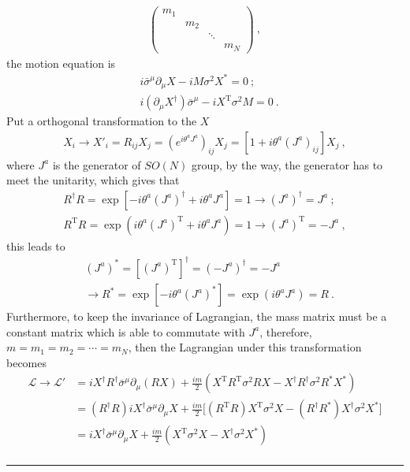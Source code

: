 \documentclass[12pt]{report}
\numberwithin{problemname}{chapter}
\newenvironment{solution}{\vspace{1em}\par\noindent{\large\textbf{\textsc{Solution}}}\par}{\vspace{1em}\hrule}
\begin{document}
\begin{solution}
\begin{enumerate}[(a)]
\begin{align}
\begin{pmatrix}
          m_1 & & & \\
          & m_2 & & \\
          & & \ddots & \\
          & & & m_N 
        \end{pmatrix}\ ,
    \end{align}
    the motion equation is
    \begin{align}
        &i\bar{\sigma}^{\mu}\partial_{\mu}X-iM\sigma^2 X^*=0\ ; \nonumber \\
        &i(\partial_{\mu}X^{\dagger})\bar{\sigma}^{\mu}-iX^{\text{T}}\sigma^2M=0\ .
    \end{align}
    Put a orthogonal transformation to the $X$
    \begin{align}
        X_i\to X'_i=R_{ij}X_j=(e^{i\theta^aJ^a})_{ij}X_j=[1+i\theta^a(J^a)_{ij}]X_j\ ,
    \end{align}
    where $J^a$ is the generator of $SO(N)$ group, by the way, the generator has to meet the unitarity, which gives that
    \begin{align}
        R^{\dagger}R= \exp[-i\theta^a(J^{a})^{\dagger}+i\theta^aJ^a]=1\to (J^{a})^{\dagger}=J^a\ ; \\
        R^{\text{T}}R=\exp(i\theta^a(J^{a})^{\text{T}}+i\theta^aJ^a)=1\to (J^a)^{\text{T}}=-J^a\ ,
    \end{align}
    this leads to
    \begin{align}
        &(J^a)^*=[(J^a)^\text{T}]^{\dagger}=(-J^a)^{\dagger}=-J^a \nonumber \\
        &\to R^*=\exp[-i\theta^a(J^a)^*]=\exp(i\theta^aJ^a)=R\ .
    \end{align}
    Furthermore, to keep the invariance of Lagrangian, the mass matrix must be a constant matrix which is able to commutate with $J^a$, therefore, $m=m_1=m_2=\cdots=m_N$, then the Lagrangian under this transformation becomes
    \begin{align}
        \mathcal{L}\to \mathcal{L}'&=iX^{\dagger}R^{\dagger}\bar{\sigma}^{\mu}\partial_{\mu}(RX)+\frac{im}{2}(X^{\text{T}}R^{\text{T}}\sigma^2RX-X^{\dagger}R^{\dagger}\sigma^2 R^*X^*) \nonumber \\
        &=(R^{\dagger}R)iX^{\dagger}\bar{\sigma}^{\mu}\partial_{\mu}X+\frac{im}{2}\bigg[(R^{\text{T}}R)X^{\text{T}}\sigma^2X-(R^{\dagger}R^*)X^{\dagger}\sigma^2 X^*\bigg] \nonumber \\
        &=iX^{\dagger}\bar{\sigma}^{\mu}\partial_{\mu}X+\frac{im}{2}(X^{\text{T}}\sigma^2X-X^{\dagger}\sigma^2 X^*) \nonumber \\

\end{align}
\end{enumerate}
\end{solution}
\end{document}
